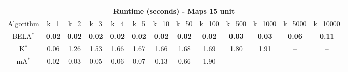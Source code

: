 \begin{tabular}{c|cccccccccccc}\toprule
\multicolumn{13}{c}{Runtime (seconds) - Maps 15 unit}\\ \midrule
Algorithm & k=1 & k=2 & k=3 & k=4 & k=5 & k=10 & k=50 & k=100 & k=500 & k=1000 & k=5000 & k=10000 \\ \midrule
BELA$^*$ & \textbf{0.02} & \textbf{0.02} & \textbf{0.02} & \textbf{0.02} & \textbf{0.02} & \textbf{0.02} & \textbf{0.02} & \textbf{0.02} & \textbf{0.03} & \textbf{0.03} & \textbf{0.06} & \textbf{0.11} \\
K$^*$ & 0.06 & 1.26 & 1.53 & 1.66 & 1.67 & 1.66 & 1.68 & 1.69 & 1.80 & 1.91 & -- & -- \\
mA$^*$ & 0.02 & 0.03 & 0.05 & 0.06 & 0.07 & 0.13 & 0.66 & 1.90 & -- & -- & -- & -- \\ \bottomrule 
\end{tabular}
